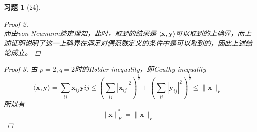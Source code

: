 \documentclass[a4paper, UTF8]{ctexart}
\newtheorem*{exercise}{\textbf{习题}}
\begin{document}
\begin{exercise}[24]
\begin{proof}[Proof 2]
\begin{equation*}
    \end{equation*}
    而由von Neumann迹定理知，此时，取到的结果是 $\langle \mathbf{x},\mathbf{y}\rangle$可以取到的上确界，而上述证明说明了这一上确界在满足对偶范数定义的条件中是可以取到的，因此上述结论成立。
  \end{proof}
  \begin{proof}[Proof 3]
    由 $p=2,q=2$时的Holder inequality，即Cauthy inequality
    \begin{equation*}
      \langle \mathbf{x}, \mathbf{y} \rangle = \sum_{ij}\mathbf{x}_{ij}\mathbf{y}{ij} \le \left( \sum_{ij} |\mathbf{x}_{ij}|^2 \right)^{\frac{1}{2}} + \left( \sum_{ij} |\mathbf{y}_{ij}|^2 \right)^{\frac{1}{2}} \le \lVert \mathbf{x} \rVert_F
    \end{equation*}
    所以有
    \begin{equation*}
      \lVert \mathbf{x} \rVert_F^* = \lVert \mathbf{x} \rVert_F
    \end{equation*}
  \end{proof}
\end{exercise}
\end{document}
